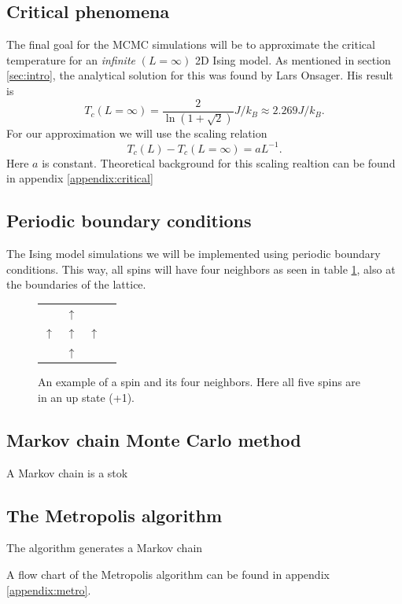 \documentclass[english,notitlepage,reprint,nofootinbib]{revtex4-1}  %
\begin{document}
\subsection*{Critical phenomena}
The final goal for the MCMC simulations will be to approximate the critical temperature for an \textit{infinite} $(L=\infty)$ 2D Ising model. As mentioned in section \ref{sec:intro}, the analytical solution for this was found by Lars Onsager. His result is
\begin{equation*}
    T_c(L=\infty) = \frac{2}{\ln(1+\sqrt{2})}J/k_B \approx 2.269 J/k_B.
\end{equation*}
For our approximation we will use the scaling relation
\begin{equation}
    T_c(L) -T_c(L=\infty) = aL^{-1}.
\end{equation}
Here $a$ is constant. Theoretical background for this scaling realtion can be found in appendix \ref{appendix:critical}


\subsection*{Periodic boundary conditions}
The Ising model simulations we will be implemented using periodic boundary conditions. This way, all spins will have four neighbors as seen in table \ref{fig:neighbors}, also at the boundaries of the lattice.
\begin{figure}[H]
    \centering
    \begin{tabular}{llll}
       & $\uparrow$ &    \\
    $\uparrow$ & $\uparrow$ & $\uparrow$ \\
       & $\uparrow$ & 
    \end{tabular}\label{fig:neighbors}
    \caption{An example of a spin and its four neighbors. Here all five spins are in an up state (+1).} 
\end{figure}

\subsection*{Markov chain Monte Carlo method}
A Markov chain is a stok

\subsection*{The Metropolis algorithm}
The algorithm generates a Markov chain 

A flow chart of the Metropolis algorithm can be found in appendix \ref{appendix:metro}.
\end{document}
